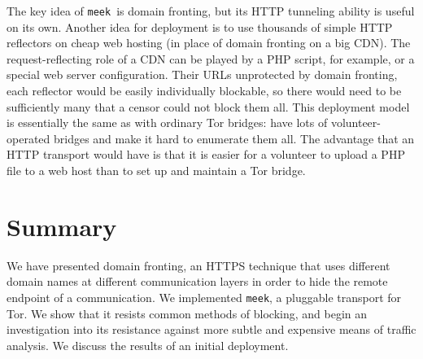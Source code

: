 \documentclass[conference]{IEEEtran}
\newcommand{\meekserver}{\mbox{meek-server}\xspace}
\newcommand{\meek}{\texttt{meek}\xspace}
\begin{document}

The key idea of \meek\ is domain fronting,
but its HTTP tunneling ability is useful on its own.
Another idea for deployment is to use
thousands of simple HTTP reflectors on cheap web hosting
(in place of domain fronting on a big CDN).
The request-reflecting role of a CDN can
be played by a PHP script, for example,
or a special web server configuration.
Their URLs unprotected by domain fronting,
each reflector would be easily individually blockable,
so there would need to be sufficiently many that
a censor could not block them all.
This deployment model is essentially the same as with
ordinary Tor bridges: have lots of volunteer-operated bridges
and make it hard to enumerate them all.
The advantage that an HTTP transport would have
is that it is easier for a volunteer to upload a PHP file to a web host
than to set up and maintain a Tor bridge.

\section{Summary}
\label{sec:summary}

We have presented domain fronting,
an HTTPS technique that uses different domain names
at different communication layers in
order to hide the remote endpoint of a communication.
We implemented \meek,
a pluggable transport for Tor.
We show that it resists common methods of blocking,
and begin an investigation into its
resistance against more subtle and expensive means of traffic analysis.
We discuss the results of an initial deployment.



\end{document}
